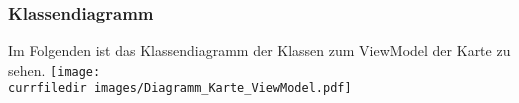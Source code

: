\begin{samepage}
    \subsubsection{Klassendiagramm}\label{App_Map_ViewModel_Klassendiagramm}
    Im Folgenden ist das Klassendiagramm der Klassen zum ViewModel der Karte zu sehen.
    \texttt{[image: \\currfiledir images/Diagramm\_Karte\_ViewModel.pdf]}
    
\end{samepage}
